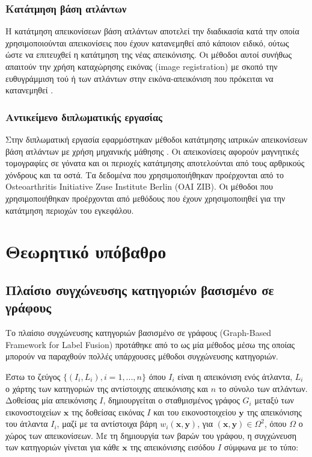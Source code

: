 \documentclass[a4paper,12pt]{article}
\begin{document}
\subsubsection{Κατάτμηση βάση ατλάντων}

Η κατάτμηση απεικονίσεων βάση ατλάντων αποτελεί την διαδικασία κατά την οποία
χρησιμοποιούνται απεικονίσεις που έχουν κατανεμηθεί από κάποιον ειδικό, ούτως
ώστε να επιτευχθεί η κατάτμηση της νέας απεικόνισης. Οι μέθοδοι αυτοί συνήθως
απαιτούν την χρήση καταχώρησης εικόνας (image registration) με σκοπό την
ευθυγράμμιση τού ή των ατλάντων στην εικόνα-απεικόνιση που πρόκειται να
κατανεμηθεί \cite{Registration_Segmentation:1}.

\subsubsection{Αντικείμενο διπλωματικής εργασίας}

Στην διπλωματική εργασία εφαρμόστηκαν μέθοδοι κατάτμησης ιατρικών απεικονίσεων
βάση ατλάντων με χρήση μηχανικής μάθησης \cite{Zhang:1} \cite{Tong:1}
\cite{Coupe:1}. Οι απεικονίσεις αφορούν μαγνητικές τομογραφίες σε γόνατα και οι
περιοχές κατάτμησης αποτελούνται από τους αρθρικούς χόνδρους και τα οστά. Τα
δεδομένα που χρησιμοποιήθηκαν προέρχονται από το Osteoarthritis Initiative Zuse
Institute Berlin (OAI ZIB). Οι μέθοδοι που χρησιμοποιήθηκαν προέρχονται από
μεθόδους που έχουν χρησιμοποιηθεί για την κατάτμηση περιοχών του εγκεφάλου.


\section{Θεωρητικό υπόβαθρο}

\subsection{Πλαίσιο συγχώνευσης κατηγοριών βασισμένο σε γράφους}
\label{Graph-Based_Framework:1}

Το πλαίσιο συγχώνευσης κατηγοριών βασισμένο σε γράφους (Graph-Based Framework
for Label Fusion) προτάθηκε από το \cite{Zhang:1} ως μία μέθοδος μέσω της οποίας
μπορούν να παραχθούν πολλές υπάρχουσες μέθοδοι συγχώνευσης κατηγοριών.

Έστω το ζεύγος $\{(I_i,L_i),i=1,...,n\}$ όπου $I_i$ είναι η απεικόνιση ενός
άτλαντα, $L_i$ ο χάρτης των κατηγοριών της αντίστοιχης απεικόνισης και $n$ το
σύνολο των ατλάντων. Δοθείσας μία απεικόνισης $I$, δημιουργείται ο σταθμισμένος
γράφος $G_i$ μεταξύ των εικονοστοιχείων $\bm{x}$ της δοθείσας εικόνας $I$ και
του εικονοστοιχείου $\bm{y}$ της απεικόνισης του άτλαντα $I_i$, μαζί με τα
αντίστοιχα βάρη $w_i(\bm{x},\bm{y})$, για $(\bm{x},\bm{y})\in\Omega^2$, όπου
$\Omega$ ο χώρος των απεικονίσεων. Με τη δημιουργία των βαρών του γράφου, η
συγχώνευση των κατηγοριών γίνεται για κάθε $\bm{x}$ της απεικόνισης εισόδου $I$
σύμφωνα με το τύπο:
\end{document}
